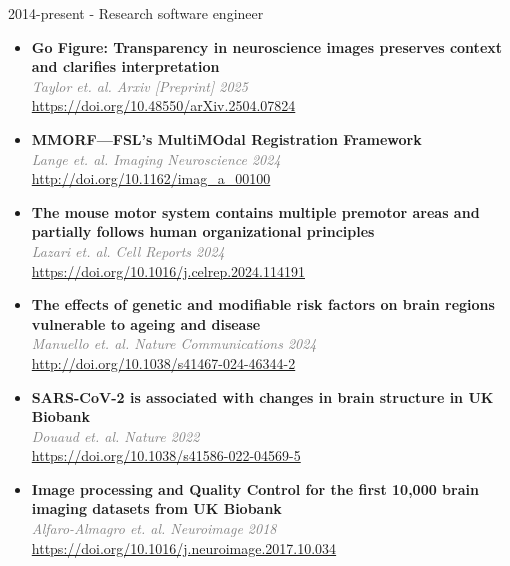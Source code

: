 \documentclass{resume}
\begin{document}
\begin{category}{2014-present - Research software engineer}
\begin{itemize}
\item {\small\small\textbf{Go Figure: Transparency in neuroscience images preserves context and
clarifies interpretation
}\\ \textcolor{grey}{\textit{Taylor et. al. Arxiv [Preprint] 2025}}}\\ \mbox{\small\url{https://doi.org/10.48550/arXiv.2504.07824}}
\item {\small\small\textbf{MMORF—FSL's MultiMOdal Registration Framework}\\ \textcolor{grey}{\textit{Lange et. al. Imaging Neuroscience 2024}}}\\ \mbox{\small\url{http://doi.org/10.1162/imag_a_00100}}
\item {\small\small\textbf{The mouse motor system contains multiple premotor areas and partially follows human organizational principles}\\ \textcolor{grey}{\textit{Lazari et. al. Cell Reports 2024}}}\\ \mbox{\small\url{https://doi.org/10.1016/j.celrep.2024.114191}}
\item {\small\small\textbf{The effects of genetic and modifiable risk factors on brain regions vulnerable to ageing and disease}\\ \textcolor{grey}{\textit{Manuello et. al. Nature Communications 2024}}}\\ \mbox{\small\url{http://doi.org/10.1038/s41467-024-46344-2}}
\item {\small\small\textbf{SARS-CoV-2 is associated with changes in brain structure in UK Biobank}\\ \textcolor{grey}{\textit{Douaud et. al. Nature 2022}}}\\ \mbox{\small\url{https://doi.org/10.1038/s41586-022-04569-5}}
\item {\small\small\textbf{Image processing and Quality Control for the first 10,000 brain imaging datasets from UK Biobank}\\ \textcolor{grey}{\textit{Alfaro-Almagro et. al. Neuroimage 2018}}}\\ \mbox{\small\url{https://doi.org/10.1016/j.neuroimage.2017.10.034}}
\end{itemize}

\end{category}
\end{document}
